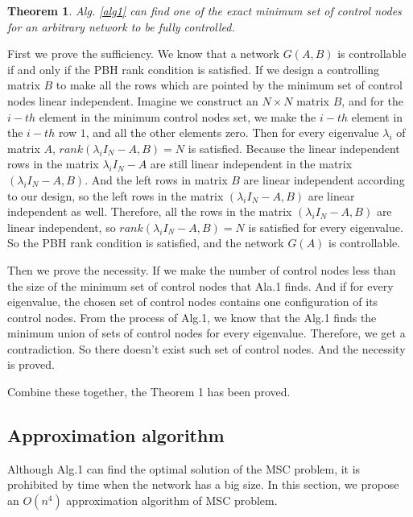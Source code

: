 \documentclass[10pt, conference, letterpaper]{IEEEtran}
\newtheorem{theorem}{Theorem}
\begin{document}
\begin{theorem}
Alg. \ref{alg1} can find one of the exact minimum set of control nodes for an arbitrary network to be fully controlled.
\end{theorem}

\begin{IEEEproof}
First we prove the sufficiency. We know that a network $G(A,B)$ is controllable if and only if the PBH rank condition is satisfied. If we design a controlling matrix $B$ to make all the rows which are pointed by the minimum set of control nodes linear independent. Imagine we construct an $N \times N$ matrix $B$, and for the $i-th$ element in the minimum control nodes set, we make the $i-th$ element in the $i-th$ row $1$, and all the other elements zero. Then for every eigenvalue $\lambda_i$ of matrix  $A$, $rank(\lambda_iI_N - A, B) = N$ is satisfied. Because the linear independent rows in the matrix $\lambda_iI_N - A$ are still linear independent in the matrix $(\lambda_iI_N - A, B)$. And the left rows in matrix $B$ are linear independent according to our design, so the left rows in the matrix $(\lambda_iI_N - A, B)$ are linear independent as well. Therefore, all the rows in the matrix $(\lambda_iI_N - A, B)$ are linear independent, so $rank(\lambda_iI_N - A, B) = N$ is satisfied for every eigenvalue. So the PBH rank condition is satisfied, and the network $G(A)$ is controllable.

Then we prove the necessity. If we make the number of control nodes less than the size of the minimum set of control nodes that Ala.1 finds. And if for every eigenvalue, the chosen set of control nodes contains one configuration of its control nodes. From the process of Alg.1, we know that the Alg.1 finds the minimum union of sets of control nodes for every eigenvalue. Therefore, we get a contradiction. So there doesn't exist such set of control nodes. And the necessity is proved.

Combine these together, the Theorem 1 has been proved.
\end{IEEEproof}

\subsection{Approximation algorithm}
Although Alg.1 can find the optimal solution of the MSC problem, it is prohibited by time when the network has a big size. In this section, we propose an $O(n^4)$ approximation algorithm of MSC problem.
\end{document}
